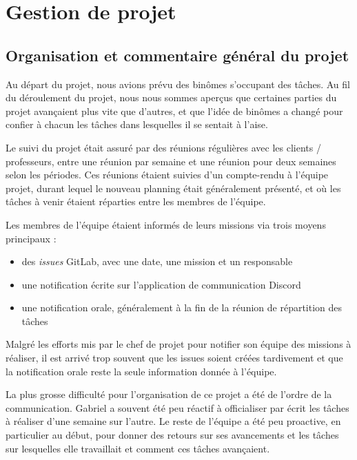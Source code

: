 \section{Gestion de projet}


\subsection{Organisation et commentaire général du projet}

Au départ du projet, nous avions prévu des binômes s'occupant
des tâches. Au fil du déroulement du projet, nous nous sommes
aperçus que certaines parties du projet avançaient plus vite
que d'autres, et que l'idée de binômes a changé pour confier
à chacun les tâches dans lesquelles il se sentait à l'aise.
\newline

Le suivi du projet était assuré par des réunions régulières
avec les clients / professeurs, entre une réunion par semaine
et une réunion pour deux semaines selon les périodes. Ces
réunions étaient suivies d'un compte-rendu à l'équipe projet,
durant lequel le nouveau planning était généralement présenté,
et où les tâches à venir étaient réparties entre les membres
de l'équipe.
\newline

Les membres de l'équipe étaient informés de leurs missions
via trois moyens principaux :
\begin{itemize}
  \item des \textit{issues} GitLab, avec une date, une mission et un responsable
  \item une notification écrite sur l'application de communication Discord
  \item une notification orale, généralement à la fin de la réunion de répartition des tâches
\end{itemize}
Malgré les efforts mis par le chef de projet pour notifier son
équipe des missions à réaliser, il est arrivé trop souvent
que les issues soient créées tardivement et que la
notification orale reste la seule information donnée à
l'équipe.
\newline

La plus grosse difficulté pour l'organisation de ce projet a
été de l'ordre de la communication. Gabriel a souvent été peu
réactif à officialiser par écrit les tâches à réaliser d'une
semaine sur l'autre. Le reste de l'équipe a été peu proactive,
en particulier au début, pour donner des retours sur ses
avancements et les tâches sur lesquelles elle travaillait et
comment ces tâches avançaient.

